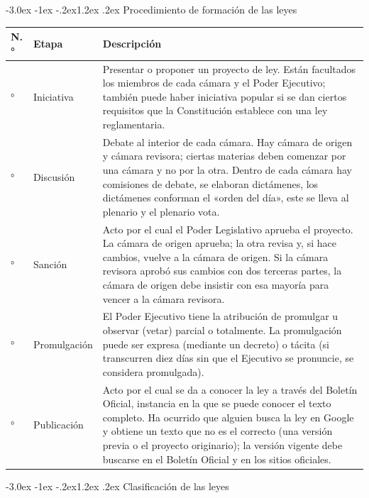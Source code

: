 \documentclass[12pt,oneside]{book}
\makeatletter
\renewcommand\section{\@startsection{section}{1}{\z@}%
  {-3.0ex \@plus -1ex \@minus -.2ex}{1.2ex \@plus .2ex}%
  {\normalfont\large\bfseries\color{acento}}}
\makeatother
\begin{document}
\section{Procedimiento de formación de las leyes}

\begin{table}[H]
\centering
\begin{tabularx}{\textwidth}{>{\centering\arraybackslash}p{} >{\raggedright\arraybackslash}p{} >{\raggedright\arraybackslash}X}
\toprule
\textbf{N.°} & \textbf{Etapa} & \textbf{Descripción} \\
\midrule
1° & Iniciativa &
Presentar o proponer un proyecto de ley. Están facultados los miembros de cada cámara y el Poder Ejecutivo; también puede haber iniciativa popular si se dan ciertos requisitos que la Constitución establece con una ley reglamentaria. \\
\addlinespace
2° & Discusión &
Debate al interior de cada cámara. Hay cámara de origen y cámara revisora; ciertas materias deben comenzar por una cámara y no por la otra. Dentro de cada cámara hay comisiones de debate, se elaboran dictámenes, los dictámenes conforman el «orden del día», este se lleva al plenario y el plenario vota. \\
\addlinespace
3° & Sanción &
Acto por el cual el Poder Legislativo aprueba el proyecto. La cámara de origen aprueba; la otra revisa y, si hace cambios, vuelve a la cámara de origen. Si la cámara revisora aprobó sus cambios con dos terceras partes, la cámara de origen debe insistir con esa mayoría para vencer a la cámara revisora. \\
\addlinespace
4° & Promulgación &
El Poder Ejecutivo tiene la atribución de promulgar u observar (vetar) parcial o totalmente. La promulgación puede ser expresa (mediante un decreto) o tácita (si transcurren diez días sin que el Ejecutivo se pronuncie, se considera promulgada). \\
\addlinespace
5° & Publicación &
Acto por el cual se da a conocer la ley a través del Boletín Oficial, instancia en la que se puede conocer el texto completo. Ha ocurrido que alguien busca la ley en Google y obtiene un texto que no es el correcto (una versión previa o el proyecto originario); la versión vigente debe buscarse en el Boletín Oficial y en los sitios oficiales. \\
\bottomrule
\end{tabularx}
\end{table}

\section{Clasificación de las leyes}
\end{document}
